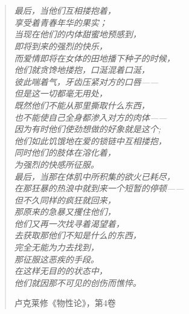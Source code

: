 \chapter*{}

\null\vfill
\begin{quote}
   \emph{最后，当他们互相搂抱着，\\
享受着青春年华的果实；\\
当现在他们的内体甜蜜地预感到，\\
即将到来的强烈的快乐，\\
而爱情即将在女体的田地播下种子的时候，\\
他们就贪馋地搂抱，口涎混着口涎，\\
彼此喘着气，牙齿压紧对方的口唇——\\
但是这一切都毫无用处，\\
既然他们不能从那里撕取什么东西，\\
也不能使自己全身都渗入对方的肉体——\\
因为有时他们使劲想做的好象就是这个; \\
他们如此饥饿地在爱的锁链中互相搂抱，\\
同时他们的肢体在溶化着，\\
为强烈的快感所征服。\\
最后，当那在体肌中所积集的欲火已耗尽，\\
在那狂暴的热浪中就到来一个短暂的停顿——\\
但不久同样的疯狂就回来，\\
那原来的急暴又攫住他们，\\
他们又再一次找寻着渴望着，\\
去获取那他们不知是什么的东西，\\
完全无能为力去找到，\\
那征服这恶疾的手段。 \\
在这样无目的的状态中，\\
他们就因那不可见的创伤而憔悴。}

\hfill 卢克莱修《物性论》，第4卷\vfill

\end{quote}
